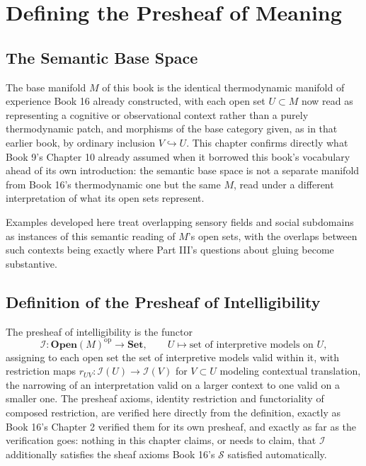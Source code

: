 \part{Defining the Presheaf of Meaning}

\chapter{The Semantic Base Space}

The base manifold $M$ of this book is the identical thermodynamic manifold of experience Book 16 already constructed, with each open set $U \subset M$ now read as representing a cognitive or observational context rather than a purely thermodynamic patch, and morphisms of the base category given, as in that earlier book, by ordinary inclusion $V \hookrightarrow U$. This chapter confirms directly what Book 9's Chapter 10 already assumed when it borrowed this book's vocabulary ahead of its own introduction: the semantic base space is not a separate manifold from Book 16's thermodynamic one but the same $M$, read under a different interpretation of what its open sets represent.

Examples developed here treat overlapping sensory fields and social subdomains as instances of this semantic reading of $M$'s open sets, with the overlaps between such contexts being exactly where Part III's questions about gluing become substantive.

\chapter{Definition of the Presheaf of Intelligibility}

The presheaf of intelligibility is the functor
\[
\mathcal{I}: \mathbf{Open}(M)^{\mathrm{op}} \to \mathbf{Set}, \qquad U \mapsto \text{set of interpretive models on } U,
\]
assigning to each open set the set of interpretive models valid within it, with restriction maps $r_{UV}: \mathcal{I}(U) \to \mathcal{I}(V)$ for $V \subset U$ modeling contextual translation, the narrowing of an interpretation valid on a larger context to one valid on a smaller one. The presheaf axioms, identity restriction and functoriality of composed restriction, are verified here directly from the definition, exactly as Book 16's Chapter 2 verified them for its own presheaf, and exactly as far as the verification goes: nothing in this chapter claims, or needs to claim, that $\mathcal{I}$ additionally satisfies the sheaf axioms Book 16's $\mathcal{S}$ satisfied automatically.

